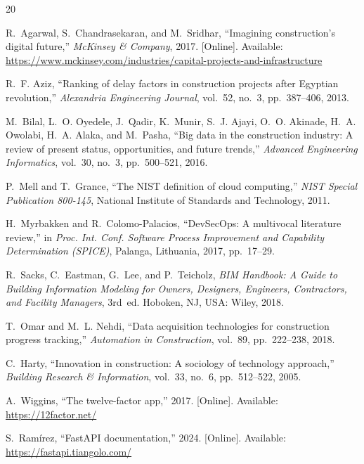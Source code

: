 \documentclass[conference]{IEEEtran}
\begin{document}

\begin{thebibliography}{20}

R.~Agarwal, S.~Chandrasekaran, and M.~Sridhar, ``Imagining construction's digital future,'' \textit{McKinsey \& Company}, 2017. [Online]. Available: \url{https://www.mckinsey.com/industries/capital-projects-and-infrastructure}

R.~F. Aziz, ``Ranking of delay factors in construction projects after Egyptian revolution,'' \textit{Alexandria Engineering Journal}, vol.~52, no.~3, pp.~387--406, 2013.

M.~Bilal, L.~O. Oyedele, J.~Qadir, K.~Munir, S.~J. Ajayi, O.~O. Akinade, H.~A. Owolabi, H.~A. Alaka, and M.~Pasha, ``Big data in the construction industry: A review of present status, opportunities, and future trends,'' \textit{Advanced Engineering Informatics}, vol.~30, no.~3, pp.~500--521, 2016.

P.~Mell and T.~Grance, ``The NIST definition of cloud computing,'' \textit{NIST Special Publication 800-145}, National Institute of Standards and Technology, 2011.

H.~Myrbakken and R.~Colomo-Palacios, ``DevSecOps: A multivocal literature review,'' in \textit{Proc. Int. Conf. Software Process Improvement and Capability Determination (SPICE)}, Palanga, Lithuania, 2017, pp.~17--29.

R.~Sacks, C.~Eastman, G.~Lee, and P.~Teicholz, \textit{BIM Handbook: A Guide to Building Information Modeling for Owners, Designers, Engineers, Contractors, and Facility Managers}, 3rd~ed. Hoboken, NJ, USA: Wiley, 2018.

T.~Omar and M.~L. Nehdi, ``Data acquisition technologies for construction progress tracking,'' \textit{Automation in Construction}, vol.~89, pp.~222--238, 2018.

C.~Harty, ``Innovation in construction: A sociology of technology approach,'' \textit{Building Research \& Information}, vol.~33, no.~6, pp.~512--522, 2005.

A.~Wiggins, ``The twelve-factor app,'' 2017. [Online]. Available: \url{https://12factor.net/}

S.~Ram\'{i}rez, ``FastAPI documentation,'' 2024. [Online]. Available: \url{https://fastapi.tiangolo.com/}


\end{thebibliography}
\end{document}
